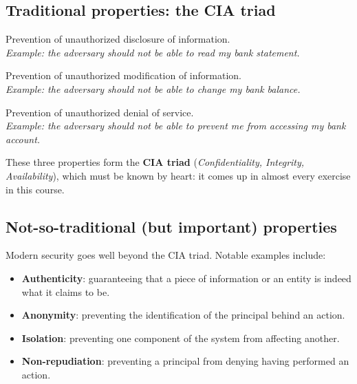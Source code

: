\subsection{Traditional properties: the CIA triad}

\begin{definition}[Confidentiality]
Prevention of unauthorized disclosure of information.\\
\emph{Example: the adversary should not be able to read my bank statement.}
\end{definition}

\begin{definition}[Integrity]
Prevention of unauthorized modification of information.\\
\emph{Example: the adversary should not be able to change my bank balance.}
\end{definition}

\begin{definition}[Availability]
Prevention of unauthorized denial of service.\\
\emph{Example: the adversary should not be able to prevent me from accessing my bank account.}
\end{definition}

These three properties form the \textbf{CIA triad} (\emph{Confidentiality, Integrity, Availability}), which must be known by heart: it comes up in almost every exercise in this course.

\subsection{Not-so-traditional (but important) properties}

Modern security goes well beyond the CIA triad. Notable examples include:

\begin{itemize}
    \item \textbf{Authenticity}: guaranteeing that a piece of information or an entity is indeed what it claims to be.
    \item \textbf{Anonymity}: preventing the identification of the principal behind an action.
    \item \textbf{Isolation}: preventing one component of the system from affecting another.
    \item \textbf{Non-repudiation}: preventing a principal from denying having performed an action.
\end{itemize}

